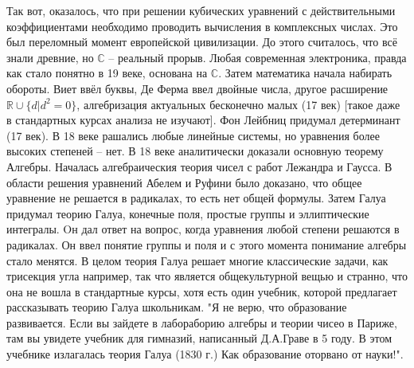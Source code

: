 \documentclass{book}
\begin{document}
Так вот, оказалось, что при решении кубических уравнений с действительными
коэффициентами необходимо проводить вычисления в комплексных числах. Это был
переломный момент европейской цивилизации. До этого считалось, что всё знали
древние, но $\mathbb{C}$ – реальный прорыв. Любая современная электроника,
правда как стало понятно в 19 веке, основана на $\mathbb{C}$. Затем математика
начала набирать обороты. Виет ввёл буквы, Де Ферма ввел двойные числа, другое
расширение $\mathbb{R}\cup\{d|d^2 = 0\}$, алгебризация актуальных бесконечно
малых (17 век) [такое даже в стандартных курсах анализа не изучают]. Фон Лейбниц
придумал детерминант (17 век). В 18 веке рашались любые линейные системы, но
уравнения более высоких степеней – нет. В 18 веке аналитически доказали основную
теорему Алгебры. Началась алгебраическия теория чисел с работ Лежандра и Гаусса.
В области решения уравнений Абелем и Руфини было доказано, что общее уравнение
не решается в радикалах, то есть нет общей формулы. Затем Галуа придумал
теорию Галуа, конечные поля, простые группы и эллиптические интегралы. Oн дал
ответ на вопрос, когда уравнения любой степени решаются в радикалах. Он ввел
понятие группы и поля и с этого момента понимание алгебры стало менятся. В
целом теория Галуа решает многие классические задачи, как трисекция угла
например, так что является общекультурной вещью и странно, что она не вошла в
стандартные курсы, хотя есть один учебник, которой предлагает рассказывать
теорию Галуа школьникам. "Я не верю, что образование развивается. Если вы
зайдете в лабораборию алгебры и теории чисео в Париже, там вы увидете учебник
для гимназий, написанный Д.А.Граве в 5 году. В этом учебнике излагалась теория
Галуа (1830 г.) Как образование оторвано от науки!".
\end{document}
